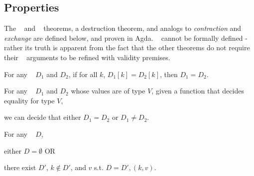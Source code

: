 \subsection{Properties}
\label{sec:DD:props}


The \SemInj~ and \EqDec~ theorems, a destruction theorem, and analogs to \emph{contraction} and
\emph{exchange} are defined below, and proven in Agda. \SemTot~ cannot be formally defined - rather
its truth is apparent from the fact that the other theorems do not require their \dd~ arguments to
be refined with validity premises.

%
%

\begin{theorem}[\SemInj]
\label{thm:SemInj}

\breakAndIndent
%
For any \dds~ $D_1$ and $D_2$,
%
if for all $k$, $D_1[k] = D_2[k]$,
%
then $D_1 = D_2$.

\end{theorem}

\begin{theorem}[\EqDec]
\label{thm:EqDec}

\breakAndIndent
%
For any \dds~ $D_1$ and $D_2$ whose values are of type $V$,
%
given a function that decides equality for type $V$,
%

\justIndent
%
we can decide that either $D_1 = D_2$ or $D_1 \ne D_2$.

\end{theorem}

\begin{theorem}
\label{thm:EzDstr}

\breakAndIndent
%
For any \dd~ $D$,

\justIndent \quad
%
either $D = \emptyset$ OR

\justIndent \quad
%
there exist $D'$, $k \notin D'$, and $v$
%
s.t. $D = D' , (k, v)$.

\end{theorem}


